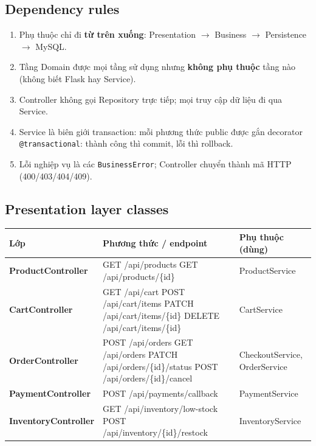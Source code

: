 \documentclass[12pt,a4paper,oneside]{report}
\begin{document}
\subsection{Dependency rules}
\begin{enumerate}\item Phụ thuộc chỉ đi \textbf{từ trên xuống}: Presentation $\to$ Business $\to$ Persistence $\to$ MySQL.\item Tầng Domain được mọi tầng sử dụng nhưng \textbf{không phụ thuộc} tầng nào (không biết Flask hay Service).\item Controller không gọi Repository trực tiếp; mọi truy cập dữ liệu đi qua Service.\item Service là biên giới transaction: mỗi phương thức public được gắn decorator \texttt{@transactional}: thành công thì commit, lỗi thì rollback.\item Lỗi nghiệp vụ là các \texttt{BusinessError}; Controller chuyển thành mã HTTP (400/403/404/409).\end{enumerate}
\subsection{Presentation layer classes}
\begin{longtable}{@{}>{\raggedright\arraybackslash\small\bfseries}p{3.4cm}>{\raggedright\arraybackslash\ttfamily\footnotesize}p{7.2cm}>{\raggedright\arraybackslash\footnotesize}p{4.6cm}@{}}\toprule Lớp & Phương thức / endpoint & Phụ thuộc (dùng)\\\midrule\endhead
ProductController & GET /api/products \newline GET /api/products/\{id\} & ProductService\\\midrule
CartController & GET /api/cart \newline POST /api/cart/items \newline PATCH /api/cart/items/\{id\} \newline DELETE /api/cart/items/\{id\} & CartService\\\midrule
OrderController & POST /api/orders \newline GET /api/orders \newline PATCH /api/orders/\{id\}/status \newline POST /api/orders/\{id\}/cancel & CheckoutService, OrderService\\\midrule
PaymentController & POST /api/payments/callback & PaymentService\\\midrule
InventoryController & GET /api/inventory/low-stock \newline POST /api/inventory/\{id\}/restock & InventoryService\\\midrule
\bottomrule\end{longtable}
\end{document}
